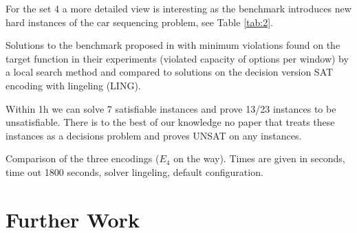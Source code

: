 \documentclass[]{llncs}
\begin{document}
For the set 4 a more detailed view is interesting as the benchmark
introduces new hard instances of the car sequencing problem, see Table
\ref{tab:2}. 

\DTLsetseparator{,}

\begin{table}[htbp]
    \caption{Solutions to the benchmark proposed in \cite{Gravel05} with
        minimum violations found on the target function in their
        experiments (violated capacity of options per window) by a local
        search method and compared to solutions on the decision version
    SAT encoding with lingeling (LING). }
    \centering
    \label{tab:2}
\end{table}


Within 1h we can solve 7 satisfiable instances and prove 13/23 instances
to be unsatisfiable. There is to the best of our knowledge no paper that
treats these instances as a decisions problem and proves UNSAT on any
instances.

\begin{table}[htbp]
    \caption{Comparison of the three encodings ($E_4$ on the way). Times
    are given in seconds, time out 1800 seconds, solver lingeling, default configuration.}
    \centering
    
    \label{tab:3}
\end{table}

\section{Further Work}
\end{document}
